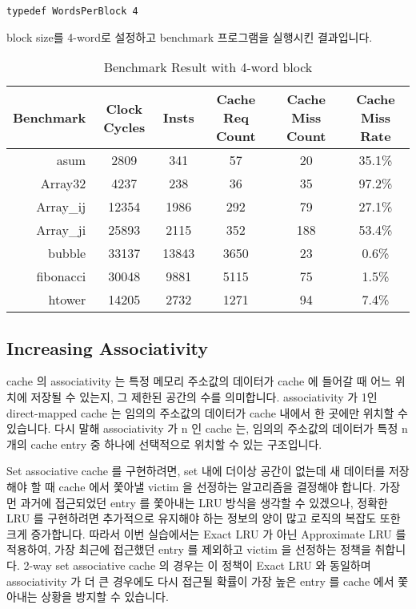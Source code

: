 \documentclass{article}
\begin{document}
\begin{Verbatim}[frame=single]
  typedef WordsPerBlock 4
\end{Verbatim}

\newpage
{} block size를 4-word로 설정하고 benchmark 프로그램을 실행시킨 결과입니다.

\begin{table}[ht]
\centering
\begin{tabular}{|r|c|c|c|c|c|}
\hline
Benchmark & Clock Cycles & Insts & Cache Req Count & Cache Miss Count & Cache Miss Rate \\
\hline
asum & 2809 & 341 & 57 & 20 & 35.1\% \\
Array32 & 4237 & 238 & 36 & 35 & 97.2\% \\
Array\_ij & 12354 & 1986 & 292 & 79 & 27.1\% \\
Array\_ji & 25893 & 2115 & 352 & 188 & 53.4\% \\
bubble & 33137 & 13843 & 3650 & 23 & 0.6\% \\
fibonacci & 30048 & 9881 & 5115 & 75 & 1.5\% \\
htower & 14205 & 2732 & 1271 & 94 & 7.4\% \\
\hline
\end{tabular}
\caption{Benchmark Result with 4-word block}
\end{table}

\subsection{Increasing Associativity}
cache 의 associativity 는 특정 메모리 주소값의 데이터가 cache 에 들어갈 때
어느 위치에 저장될 수 있는지, 그 제한된 공간의 수를 의미합니다.
associativity 가 1인 direct-mapped cache 는 임의의 주소값의 데이터가
cache 내에서 한 곳에만 위치할 수 있습니다. 다시 말해 associativity 가 n 인
cache 는, 임의의 주소값의 데이터가 특정 n 개의 cache entry 중 하나에 선택적으로 위치할 수 
있는 구조입니다. 

Set associative cache 를 구현하려면, set 내에 더이상 공간이 없는데 새 데이터를 저장해야
할 때 cache 에서 쫓아낼 victim 을 선정하는 알고리즘을 결정해야 합니다.
가장 먼 과거에 접근되었던 entry 를 쫓아내는 LRU 방식을 생각할 수 있겠으나,
정확한 LRU 를 구현하려면 추가적으로 유지해야 하는 정보의 양이 많고
로직의 복잡도 또한 크게 증가합니다. 따라서 이번 실습에서는 Exact LRU 가 아닌
Approximate LRU 를 적용하여, 가장 최근에 접근했던 entry 를 제외하고 victim 을 선정하는
정책을 취합니다. 2-way set associative cache 의 경우는 이 정책이 Exact LRU 와 동일하며
associativity 가 더 큰 경우에도 다시 접근될 확률이 가장 높은 entry 를 
cache 에서 쫓아내는 상황을 방지할 수 있습니다.
\end{document}
